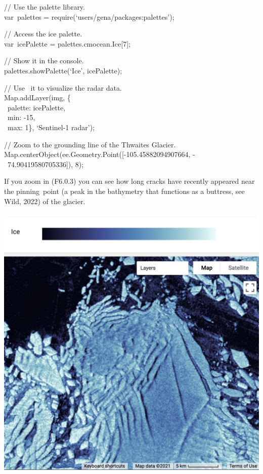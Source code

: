\documentclass[
  letterpaper,
  DIV=11,
  numbers=noendperiod]{scrreprt}
\begin{document}
// Use the palette library.\\
var~palettes = require(`users/gena/packages:palettes');

// Access the ice palette.\\
var~icePalette = palettes.cmocean.Ice{[}7{]};

// Show it in the console.\\
palettes.showPalette(`Ice', icePalette);

// Use ~it to visualize the radar data.\\
Map.addLayer(img, \{\\
\hspace*{0.333em} ~palette: icePalette,\\
\hspace*{0.333em} ~min: -15,\\
\hspace*{0.333em} ~max: 1\}, `Sentinel-1 radar');

// Zoom to the grounding line of the Thwaites Glacier.\\
Map.centerObject(ee.Geometry.Point({[}-105.45882094907664, -~
~74.90419580705336{]}), 8);

If you zoom in (F6.0.3) you can see how long cracks have recently
appeared near the pinning~point (a peak in the bathymetry that functions
as a buttress, see Wild, 2022) of the glacier.

\includegraphics{./F6/image13.png}
\end{document}
